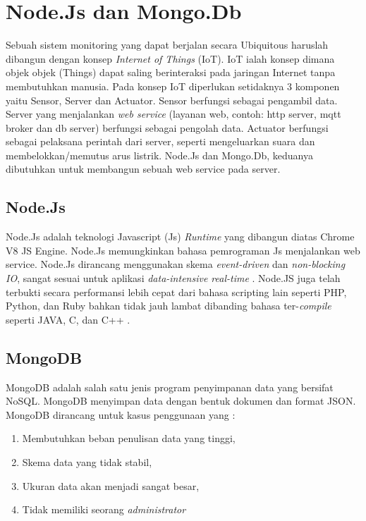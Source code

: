 \section{Node.Js dan Mongo.Db}
Sebuah sistem monitoring yang dapat berjalan secara Ubiquitous haruslah dibangun dengan konsep \textit{Internet of Things} (IoT). IoT ialah konsep dimana objek objek (Things) dapat saling berinteraksi pada jaringan Internet tanpa membutuhkan manusia. Pada konsep IoT diperlukan setidaknya 3 komponen yaitu Sensor, Server dan Actuator. Sensor berfungsi sebagai pengambil data. Server yang menjalankan \textit{web service} (layanan web, contoh: http server, mqtt broker dan db server) berfungsi sebagai pengolah data. Actuator berfungsi sebagai pelaksana perintah dari server, seperti mengeluarkan suara dan membelokkan/memutus arus listrik. Node.Js dan Mongo.Db, keduanya dibutuhkan untuk membangun sebuah web service pada server.

\subsection{Node.Js}
Node.Js adalah teknologi Javascript (Js) \textit{Runtime} yang dibangun diatas Chrome V8 JS Engine. Node.Js memungkinkan bahasa pemrograman Js menjalankan web service. Node.Js dirancang menggunakan skema \textit{event-driven} dan \textit{non-blocking IO}, sangat sesuai untuk aplikasi \textit{data-intensive real-time} \cite{nodejs}. Node.JS juga telah terbukti secara performansi lebih cepat dari bahasa scripting lain seperti PHP, Python, dan Ruby bahkan tidak jauh lambat dibanding bahasa ter-\textit{compile} seperti JAVA, C, dan C++ \cite{node_comparisson}.

\subsection{MongoDB}
MongoDB adalah salah satu jenis program penyimpanan data yang bersifat NoSQL. MongoDB menyimpan data dengan bentuk dokumen dan format JSON. MongoDB dirancang untuk kasus penggunaan yang \cite{why_mongo}:
\begin{enumerate}
	\item Membutuhkan beban penulisan data yang tinggi,
	\item Skema data yang tidak stabil,
	\item Ukuran data akan menjadi sangat besar,
	\item Tidak memiliki seorang \textit{administrator}
\end{enumerate}

